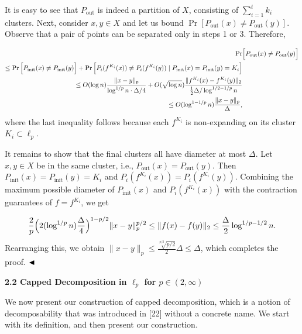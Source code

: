 \documentclass[10pt,a4paper]{amsart}
\begin{document}
\par
It is easy to see that $P_{\text{out}}$ is indeed a partition of $X$, consisting of $\sum_{i=1}^{t}k_{i}$ clusters. Next, consider $x,y\in X$ and let us bound $\Pr[P_{\text{out}}(x)\neq P_{\text{out}}(y)]$. Observe that a pair of points can be separated only in steps 1 or 3. Therefore,
\par
\[\begin{aligned}
\displaystyle\Pr & \displaystyle\Big{[}P_{\text{out}}(x)\neq P_{\text{out}}(y)\Big{]} \\
\displaystyle\leq\Pr\Big{[}P_{\text{init}}(x)\neq P_{\text{init}}(y)\Big{]}+%
\Pr\Big{[}P_{i}(f^{K_{i}}(x))\neq P_{i}(f^{K_{i}}(y))\mid P_{\text{init}}(x)=P%
_{\text{init}}(y)=K_{i}\Big{]} \\
\displaystyle\leq O(\log{n})\frac{\|x-y\|_{p}}{\log^{1/p}{n}\cdot\Delta/4}+O(%
\sqrt{\log{n}})\frac{\|f^{K_{i}}(x)-f^{K_{i}}(y)\|_{2}}{\frac{1}{2}\Delta/\log%
^{1/2-1/p}n} \\
\displaystyle\leq O(\log^{1-1/p}{n})\frac{\|x-y\|_{p}}{\Delta},
\end{aligned}\]
where the last inequality follows because each $f^{K_{i}}$ is non-expanding on its cluster $K_{i}\subset\ell_{p}$.
\par
\par
It remains to show that the final clusters all have diameter at most $\Delta$. Let $x,y\in X$ be in the same cluster, i.e., $P_{\text{out}}(x)=P_{\text{out}}(y)$. Then $P_{\text{init}}(x)=P_{\text{init}}(y)=K_{i}$ and $P_{i}(f^{K_{i}}(x))=P_{i}(f^{K_{i}}(y))$. Combining the maximum possible diameter of $P_{\text{init}}(x)$ and $P_{i}(f^{K_{i}}(x))$ with the contraction guarantees of $f=f^{K_{i}}$, we get
\par
\[\begin{aligned}
\frac{2}{p}\Big{(}2(\log^{1/p}{n})\frac{\Delta}{4}\Big{)}^{1-p/2}\|x-y\|_{p}^{%
p/2}\leq\|f(x)-f(y)\|_{2}\leq\frac{\Delta}{2}\log^{1/p-1/2}{n}.
\end{aligned}\]
Rearranging this, we obtain $\|x-y\|_{p}\leq\frac{\sqrt[p/2]{p/2}}{2}\Delta\leq\Delta$, which completes the proof. $\hfill\blacktriangleleft$
\par
\par
\par
\par
\par\medskip\noindent\textbf{2.2 Capped Decomposition in $\ell_{p}$ for $p\in(2,\infty)$}\par
We now present our construction of capped decomposition, which is a notion of decomposability that was introduced in [22] without a concrete name. We start with its definition, and then present our construction.
\end{document}
